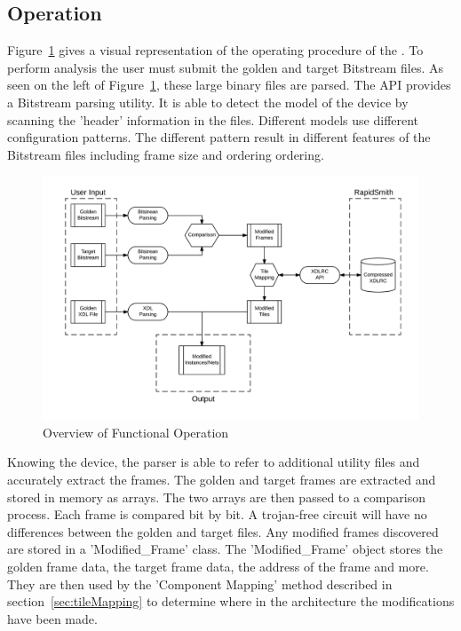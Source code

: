 \subsection{Operation} \label{sec:operation}
Figure~\ref{fig:Operation} gives a visual representation of the operating procedure of the \Name.
To perform analysis the user must submit the \gls{golden} and \gls{target} \gls{Bitstream} files.
As seen on the left of Figure~\ref{fig:Operation}, these large binary files are parsed. 
The \RapidSmith \acrshort{API} provides a \gls{Bitstream} parsing utility.
It is able to detect the model of the device by scanning the 'header' information in the files.
Different \Xilinx models use different configuration patterns.
The different pattern result in different features of the \gls{Bitstream} files including frame size and ordering ordering. 
\begin{figure}[h]
	\centering
	\includegraphics[width=1\linewidth]{Figures/Operation}
	\caption[Overview of Functional Operation]{Overview of Functional Operation}
	\label{fig:Operation}
\end{figure}
Knowing the device, the parser is able to refer to additional utility files and accurately extract the frames.
The \gls{golden} and \gls{target} frames are extracted and stored in memory as arrays.
The two arrays are then passed to a comparison process.
Each frame is compared bit by bit.
A trojan-free circuit will have no differences between the \gls{golden} and \gls{target} files.
Any modified frames discovered are stored in a 'Modified\_Frame' class.
The 'Modified\_Frame' object stores the \gls{golden} frame data, the \gls{target} frame data, the address of the frame and more.
They are then used by the 'Component Mapping' method described in section~\ref{sec:tileMapping} to determine where in the architecture the modifications have been made.


